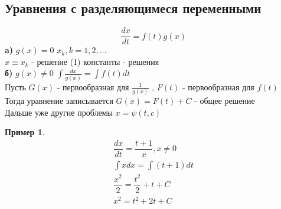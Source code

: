 \documentclass[12pt,a4paper,hidelinks]{article}            %
\newcommand{\dd}[2]{\dfrac{d #1}{d #2}}
\newtheorem*{mex}{Пример}
\begin{document}
\subsection{Уравнения с разделяющимеся переменными}
$$\dd{x}{t}=f(t)g(x)$$
{\bfseries a)} $g(x)=0$ $x_k,k=1,2,\ldots$ \\
$x\equiv x_k$ - решение (1) константы - решения \\
{\bfseries б)} $g(x)\not=0$  $\int\frac{dx}{g(x)}=\int f(t)dt$ \\
Пусть $G(x)$ - первообразная для $\frac{1}{g(x)}$ , $F(t)$ - первообразная для $f(t)$ \\
Тогда уравнение записывается $G(x)=F(t)+C$ - общее решение \\
Дальше уже другие проблемы $x=\psi(t,c)$ \\
\begin{mex}
\begin{gather*}
	\dd{x}{t}=\dfrac{t+1}{x}, x\not=0 \\
	\int xdx=\int(t+1)dt \\
	\dfrac{x^2}{2}=\dfrac{t^2}{2}+t+C \\
	x^2=t^2+2t+C
\end{gather*}
\end{mex}
\end{document}
